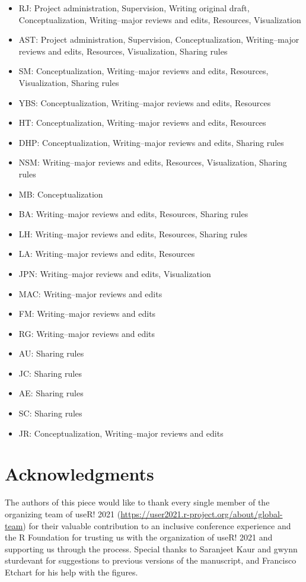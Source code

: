 \documentclass[10pt,letterpaper]{article}
\begin{document}
\begin{itemize}
    \item RJ: Project administration, Supervision, Writing original draft, Conceptualization, Writing--major reviews and edits, Resources, Visualization
    \item AST: Project administration, Supervision, Conceptualization,  Writing--major reviews and edits, Resources, Visualization, Sharing rules
    \item SM: Conceptualization, Writing--major reviews and edits, Resources, Visualization, Sharing rules
    \item YBS: Conceptualization, Writing--major reviews and edits, Resources
    \item HT: Conceptualization, Writing--major reviews and edits, Resources
    \item DHP: Conceptualization, Writing--major reviews and edits, Sharing rules
    \item NSM: Writing--major reviews and edits, Resources, Visualization, Sharing rules
    \item MB: Conceptualization
    \item BA: Writing--major reviews and edits, Resources, Sharing rules
    \item LH: Writing--major reviews and edits, Resources, Sharing rules
    \item LA: Writing--major reviews and edits, Resources
    \item JPN: Writing--major reviews and edits, Visualization
    \item MAC: Writing--major reviews and edits
    \item FM: Writing--major reviews and edits
    \item RG: Writing--major reviews and edits
    \item AU: Sharing rules
    \item JC: Sharing rules
    \item AE: Sharing rules
    \item SC: Sharing rules
    \item JR: Conceptualization, Writing--major reviews and edits
\end{itemize}



\section*{Acknowledgments}
The authors of this piece would like to thank every single member of the organizing team of useR! 2021 (\url{https://user2021.r-project.org/about/global-team}) for their valuable contribution to an inclusive conference experience and the R Foundation for trusting us with the organization of useR! 2021 and supporting us through the process. Special thanks to Saranjeet Kaur and gwynn sturdevant for suggestions to previous versions of the manuscript, and Francisco Etchart for his help with the figures.
\end{document}
